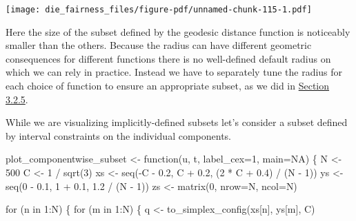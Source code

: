 \documentclass[
  letterpaper,
  DIV=11,
  numbers=noendperiod]{scrartcl}
\newenvironment{Shaded}{\begin{snugshade}}{\end{snugshade}}
\newcommand{\AttributeTok}[1]{\textcolor[rgb]{0.40,0.45,0.13}{#1}}
\newcommand{\ConstantTok}[1]{\textcolor[rgb]{0.56,0.35,0.01}{#1}}
\newcommand{\ControlFlowTok}[1]{\textcolor[rgb]{0.00,0.23,0.31}{#1}}
\newcommand{\DecValTok}[1]{\textcolor[rgb]{0.68,0.00,0.00}{#1}}
\newcommand{\FloatTok}[1]{\textcolor[rgb]{0.68,0.00,0.00}{#1}}
\newcommand{\FunctionTok}[1]{\textcolor[rgb]{0.28,0.35,0.67}{#1}}
\newcommand{\NormalTok}[1]{\textcolor[rgb]{0.00,0.23,0.31}{#1}}
\newcommand{\OtherTok}[1]{\textcolor[rgb]{0.00,0.23,0.31}{#1}}
\newcommand{\SpecialCharTok}[1]{\textcolor[rgb]{0.37,0.37,0.37}{#1}}
\begin{document}
\texttt{[image: die\_fairness\_files/figure-pdf/unnamed-chunk-115-1.pdf]}

Here the size of the subset defined by the geodesic distance function is
noticeably smaller than the others. Because the radius can have
different geometric consequences for different functions there is no
well-defined default radius on which we can rely in practice. Instead we
have to separately tune the radius for each choice of function to ensure
an appropriate subset, as we did in \href{@sec:effective_direct}{Section
3.2.5}.

While we are visualizing implicitly-defined subsets let's consider a
subset defined by interval constraints on the individual components.

\begin{Shaded}
\begin{Highlighting}[]
\NormalTok{plot\_componentwise\_subset }\OtherTok{\textless{}{-}} \ControlFlowTok{function}\NormalTok{(u, t, }\AttributeTok{label\_cex=}\DecValTok{1}\NormalTok{, }\AttributeTok{main=}\ConstantTok{NA}\NormalTok{) \{}
\NormalTok{  N }\OtherTok{\textless{}{-}} \DecValTok{500}
\NormalTok{  C }\OtherTok{\textless{}{-}} \DecValTok{1} \SpecialCharTok{/} \FunctionTok{sqrt}\NormalTok{(}\DecValTok{3}\NormalTok{)}
\NormalTok{  xs }\OtherTok{\textless{}{-}} \FunctionTok{seq}\NormalTok{(}\SpecialCharTok{{-}}\NormalTok{C }\SpecialCharTok{{-}} \FloatTok{0.2}\NormalTok{, C }\SpecialCharTok{+} \FloatTok{0.2}\NormalTok{, (}\DecValTok{2} \SpecialCharTok{*}\NormalTok{ C }\SpecialCharTok{+} \FloatTok{0.4}\NormalTok{) }\SpecialCharTok{/}\NormalTok{ (N }\SpecialCharTok{{-}} \DecValTok{1}\NormalTok{))}
\NormalTok{  ys }\OtherTok{\textless{}{-}} \FunctionTok{seq}\NormalTok{(}\DecValTok{0} \SpecialCharTok{{-}} \FloatTok{0.1}\NormalTok{, }\DecValTok{1} \SpecialCharTok{+} \FloatTok{0.1}\NormalTok{, }\FloatTok{1.2} \SpecialCharTok{/}\NormalTok{ (N }\SpecialCharTok{{-}} \DecValTok{1}\NormalTok{))}
\NormalTok{  zs }\OtherTok{\textless{}{-}} \FunctionTok{matrix}\NormalTok{(}\DecValTok{0}\NormalTok{, }\AttributeTok{nrow=}\NormalTok{N, }\AttributeTok{ncol=}\NormalTok{N)}

  \ControlFlowTok{for}\NormalTok{ (n }\ControlFlowTok{in} \DecValTok{1}\SpecialCharTok{:}\NormalTok{N) \{}
    \ControlFlowTok{for}\NormalTok{ (m }\ControlFlowTok{in} \DecValTok{1}\SpecialCharTok{:}\NormalTok{N) \{}
\NormalTok{      q }\OtherTok{\textless{}{-}} \FunctionTok{to\_simplex\_config}\NormalTok{(xs[n], ys[m], C)}


\end{Highlighting}
\end{Shaded}
\end{document}
